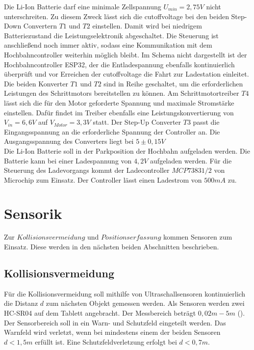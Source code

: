 Die Li-Ion Batterie darf eine minimale Zellspannung $U_{min} =2,75V$ nicht unterschreiten. Zu diesem Zweck lässt sich die \acrshort{cutoffvoltage} bei den beiden Step-Down Convertern $T1$ und $T2$ einstellen. Damit wird bei  niedrigem Batteriezustand die Leistungselektronik abgeschaltet. Die Steuerung ist anschließend noch immer aktiv, sodass eine Kommunikation mit dem Hochbahncontroller weiterhin möglich bleibt. Im Schema nicht dargestellt ist der Hochbahncontroller ESP32, der die Entladespannung ebenfalls kontinuierlich überprüft und vor Erreichen der \acrshort{cutoffvoltage} die Fahrt zur Ladestation einleitet. Die beiden Konverter $T1$ und $T2$ sind in Reihe geschaltet, um die erforderlichen Leistungen des Schrittmotors bereitstellen zu können. Am Schrittmotortreiber $T4$ lässt sich die für den Motor geforderte Spannung und maximale Stromstärke einstellen. Dafür findet im Treiber ebenfalls eine Leistungskonvertierung von $V_{in}=6,6V$ auf $V_{Motor}=3,3V$ statt. Der Step-Up Converter $T3$ passt die Eingangsspannung an die erforderliche Spannung der Controller an. Die Ausgangsspannung des Converters liegt bei $5 \pm 0,15 V$ \\

Die Li-Ion Batterie soll in der Parkposition der Hochbahn aufgeladen werden. Die Batterie kann bei einer Ladespannung von $4,2V$ aufgeladen werden. Für die Steuerung des Ladevorgangs kommt der Ladecontroller $MCP73831/2$ von Microchip zum Einsatz. Der Controller lässt einen Ladestrom von $500mA$ zu. 


\newpage

\section{Sensorik}
\label{sec:konzeptSensorik}
Zur $Kollisionsvermeidung$ und $Positionserfassung$ kommen Sensoren zum Einsatz. Diese werden in den nächsten beiden Abschnitten beschrieben.

\subsection{Kollisionsvermeidung}
\label{sec:konzeptKollisionsvermeidung}
Für die Kollisionsvermeidung soll mithilfe von Ultraschallsensoren kontinuierlich die Distanz $d$ zum nächsten Objekt gemessen werden. Als Sensoren werden zwei HC-SR04 auf dem Tablett angebracht. Der Messbereich beträgt $0,02m - 5m$ (\cite{hcrs04}). Der Sensorbereich soll in ein Warn- und Schutzfeld eingeteilt werden. Das Warnfeld wird verletzt, wenn bei mindestens einem der beiden Sensoren $d<1,5m$ erfüllt ist. Eine Schutzfeldverletzung erfolgt bei $d<0,7m$. 

